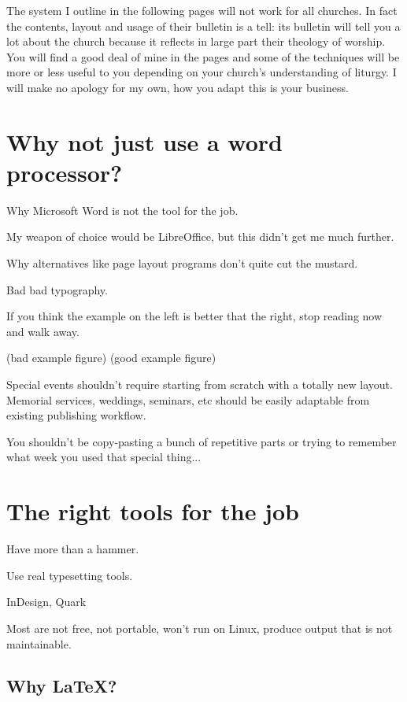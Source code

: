 \documentclass[12pt]{scrartcl}
\begin{document}
The system I outline in the following pages will not work for all churches. In
fact the contents, layout and usage of their bulletin is a tell: its bulletin
will tell you a lot about the church because it reflects in large part their
theology of worship. You will find a good deal of mine in the pages and some of
the techniques will be more or less useful to you depending on your church's
understanding of liturgy. I will make no apology for my own, how you adapt this
is your business.

\tableofcontents

\section{Why not just use a word processor?}

Why Microsoft Word is not the tool for the job.

My weapon of choice would be LibreOffice, but this didn't get me much further.

Why alternatives like page layout programs don't quite cut the mustard.

Bad bad typography.

If you think the example on the left is better that the right, stop reading now
and walk away.

(bad example figure) (good example figure)

Special events shouldn't require starting from scratch with a totally new
layout. Memorial services, weddings, seminars, etc should be easily adaptable
from existing publishing workflow.

You shouldn't be copy-pasting a bunch of repetitive parts or trying to remember
what week you used that special thing...

\section{The right tools for the job}

Have more than a hammer.

Use real typesetting tools.

InDesign, Quark

Most are not free, not portable, won't run on Linux, produce output that is not
maintainable.

\subsection{Why \LaTeX?}
\end{document}
